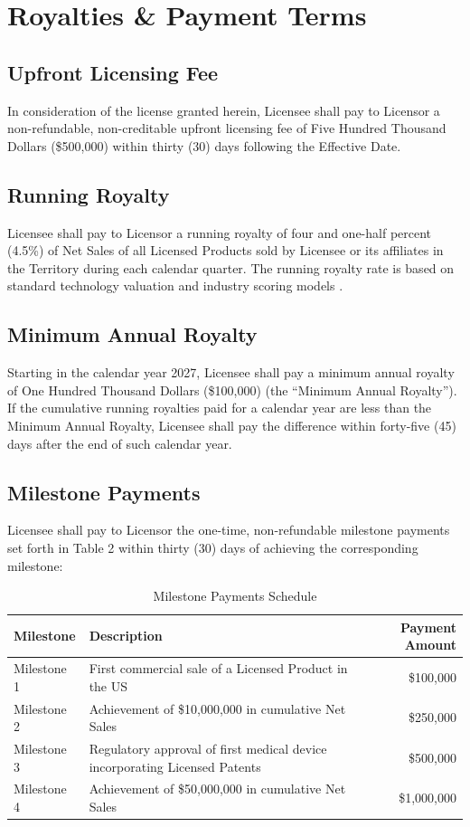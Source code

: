 \section{Royalties \& Payment Terms}

\subsection{Upfront Licensing Fee} In consideration of the license granted herein, Licensee shall pay to Licensor a non-refundable, non-creditable upfront licensing fee of Five Hundred Thousand Dollars (\$500,000) within thirty (30) days following the Effective Date.

\subsection{Running Royalty} Licensee shall pay to Licensor a running royalty of four and one-half percent (4.5\%) of Net Sales of all Licensed Products sold by Licensee or its affiliates in the Territory during each calendar quarter. The running royalty rate is based on standard technology valuation and industry scoring models \cite{goldscheider2025}.

\subsection{Minimum Annual Royalty} Starting in the calendar year 2027, Licensee shall pay a minimum annual royalty of One Hundred Thousand Dollars (\$100,000) (the ``Minimum Annual Royalty''). If the cumulative running royalties paid for a calendar year are less than the Minimum Annual Royalty, Licensee shall pay the difference within forty-five (45) days after the end of such calendar year.

\subsection{Milestone Payments} Licensee shall pay to Licensor the one-time, non-refundable milestone payments set forth in Table 2 within thirty (30) days of achieving the corresponding milestone:

\begin{table}[h]
  \centering
  \caption{Milestone Payments Schedule}
  \label{tab:milestones}
  \begin{tabularx}{\textwidth}{l X r}
    \toprule
    \textbf{Milestone} & \textbf{Description} & \textbf{Payment Amount} \\
    \midrule
    Milestone 1 & First commercial sale of a Licensed Product in the US & \$100,000 \\
    Milestone 2 & Achievement of \$10,000,000 in cumulative Net Sales & \$250,000 \\
    Milestone 3 & Regulatory approval of first medical device incorporating Licensed Patents & \$500,000 \\
    Milestone 4 & Achievement of \$50,000,000 in cumulative Net Sales & \$1,000,000 \\
    \bottomrule
  \end{tabularx}
\end{table}

